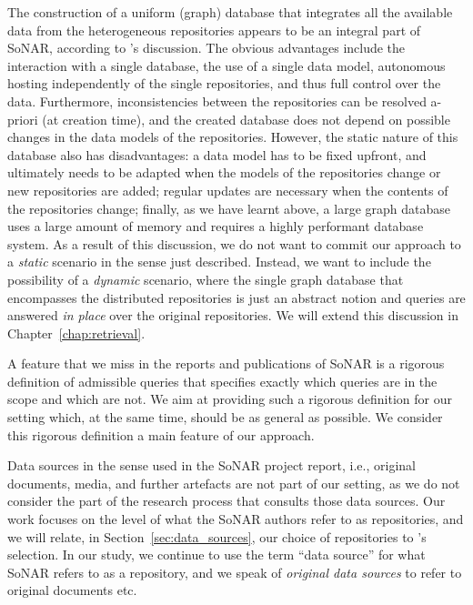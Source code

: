 The construction of a uniform (graph) database that integrates all the available data
from the heterogeneous repositories appears to be an integral part of \gls{SoNAR},
according to \citeauthor*{Menzel2020}'s \autocite*{Menzel2020} discussion.
The obvious advantages include the interaction with a single database,
the use of a single data model, autonomous hosting
independently of the single repositories, and thus full control over the data.
Furthermore, inconsistencies
between the repositories can be resolved a-priori (at creation time),
and the created database does not depend on possible changes in the data models of the repositories.
However, the static nature of this database also has disadvantages:
a data model has to be fixed upfront, and ultimately needs to be adapted when
the models of the repositories change or new repositories are added;
regular updates are necessary when the contents of the repositories change;
finally, as we have learnt above,
a large graph database uses a large amount of memory and requires a highly performant
database system.
As a result of this discussion,
we do not want to commit our approach to a \emph{static} scenario
in the sense just described.
Instead, we want to include the possibility of a \emph{dynamic} scenario,
where the single graph database that encompasses the distributed repositories
is just an abstract notion and queries are answered
\emph{in place} over the original repositories.
We will extend this discussion in Chapter~\ref{chap:retrieval}.

A feature that we miss in the reports and publications of \gls{SoNAR} is a rigorous definition of admissible queries
that specifies exactly which queries are in the scope and which are not.
We aim at providing such a rigorous definition for our setting
which, at the same time, should be as general as possible. We consider this rigorous definition
a main feature of our approach.

Data sources in the sense used in the \gls{SoNAR} project report,
i.e., original documents, media, and further artefacts
are not part of our setting, as we do not consider the part of the research process
that consults those data sources. Our work focuses on the level of
what the \gls{SoNAR} authors refer to as repositories,
and we will relate, in Section~\ref{sec:data_sources}, our choice of repositories
to \citeauthor*{Menzel2020}'s \autocite*{Menzel2020} selection.
In our study, we continue to use the term \enquote{data source} for what
\gls{SoNAR} refers to as a repository,
and we speak of \emph{original data sources} to refer to original documents etc.

